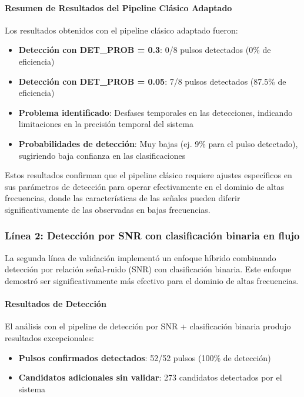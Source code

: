 \paragraph{Resumen de Resultados del Pipeline Clásico Adaptado}

Los resultados obtenidos con el pipeline clásico adaptado fueron:

\begin{itemize}
    \item \textbf{Detección con DET\_PROB = 0.3}: 0/8 pulsos detectados (0\% de eficiencia)
    \item \textbf{Detección con DET\_PROB = 0.05}: 7/8 pulsos detectados (87.5\% de eficiencia)
    \item \textbf{Problema identificado}: Desfases temporales en las detecciones, indicando limitaciones en la precisión temporal del sistema
    \item \textbf{Probabilidades de detección}: Muy bajas (ej. 9\% para el pulso detectado), sugiriendo baja confianza en las clasificaciones
\end{itemize}

Estos resultados confirman que el pipeline clásico requiere ajustes específicos en sus parámetros de detección para operar efectivamente en el dominio de altas frecuencias, donde las características de las señales pueden diferir significativamente de las observadas en bajas frecuencias.

\subsubsection{Línea 2: Detección por SNR con clasificación binaria en flujo}

La segunda línea de validación implementó un enfoque híbrido combinando detección por relación señal-ruido (SNR) con clasificación binaria. Este enfoque demostró ser significativamente más efectivo para el dominio de altas frecuencias.

\paragraph{Resultados de Detección}

El análisis con el pipeline de detección por SNR + clasificación binaria produjo resultados excepcionales:

\begin{itemize}
    \item \textbf{Pulsos confirmados detectados}: 52/52 pulsos (100\% de detección)
    \item \textbf{Candidatos adicionales sin validar}: 273 candidatos detectados por el sistema
\end{itemize}

